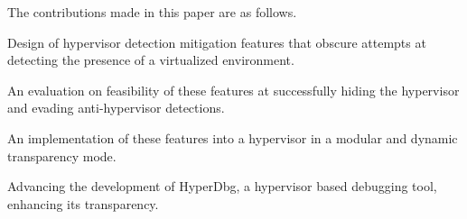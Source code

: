 The contributions made in this paper are as follows.

\case{}
Design of hypervisor detection mitigation features that obscure attempts at detecting the presence of a virtualized environment.

\case{}
An evaluation on feasibility of these features at successfully hiding the hypervisor and evading anti-hypervisor detections.

\case{}
An implementation of these features into a hypervisor in a modular and dynamic transparency mode.

\case{}
Advancing the development of HyperDbg, a hypervisor based debugging tool, enhancing its transparency.


